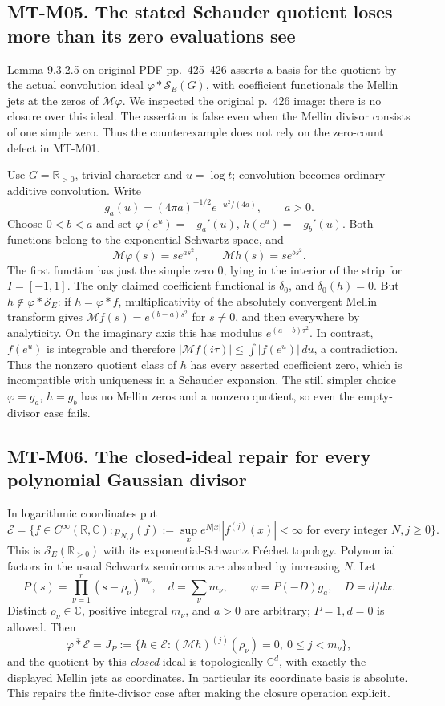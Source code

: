 \subsection*{MT-M05. The stated Schauder quotient loses more than its zero evaluations see}
Lemma 9.3.2.5 on original PDF pp.~425--426 asserts a basis for the
quotient by the actual convolution ideal $\varphi*\mathcal S_E(G)$,
with coefficient functionals the Mellin jets at the zeros of
$\mathcal M\varphi$. We inspected the original p.~426 image: there
is no closure over this ideal. The assertion is false even when the
Mellin divisor consists of one simple zero. Thus the counterexample
does not rely on the zero-count defect in MT-M01.

Use $G=\mathbb R_{>0}$, trivial character and $u=\log t$; convolution
becomes ordinary additive convolution. Write
\[
 g_a(u)=(4\pi a)^{-1/2}e^{-u^2/(4a)},\qquad a>0.
\]
Choose $0<b<a$ and set $\varphi(e^u)=-g_a'(u)$,
$h(e^u)=-g_b'(u)$. Both functions belong to the exponential-Schwartz
space, and
\[
 \mathcal M\varphi(s)=s e^{as^2},\qquad
 \mathcal Mh(s)=s e^{bs^2}.
\]
The first function has just the simple zero $0$, lying in the interior
of the strip for $I=[-1,1]$. The only claimed coefficient functional is
$\delta_0$, and $\delta_0(h)=0$.
But $h\notin\varphi*\mathcal S_E$: if $h=\varphi*f$, multiplicativity
of the absolutely convergent Mellin transform gives
$\mathcal Mf(s)=e^{(b-a)s^2}$ for $s\ne0$, and then everywhere by
analyticity. On the imaginary axis this has modulus
$e^{(a-b)\tau^2}$. In contrast, $f(e^u)$ is integrable and therefore
$|\mathcal Mf(i\tau)|\le\int|f(e^u)|\,du$, a contradiction.
Thus the nonzero quotient class of $h$ has every asserted coefficient
zero, which is incompatible with uniqueness in a Schauder expansion.
The still simpler choice $\varphi=g_a$, $h=g_b$ has no Mellin zeros
and a nonzero quotient, so even the empty-divisor case fails.

\subsection*{MT-M06. The closed-ideal repair for every polynomial Gaussian divisor}
In logarithmic coordinates put
\[
 \mathcal E=\{f\in C^\infty(\mathbb R,\mathbb C):
   p_{N,j}(f):=\sup_x e^{N|x|}|f^{(j)}(x)|<\infty
   \text{ for every integer }N,j\ge0\}.
\]
This is $\mathcal S_E(\mathbb R_{>0})$ with its exponential-Schwartz
Fr\'echet topology. Polynomial factors in the usual Schwartz seminorms
are absorbed by increasing $N$. Let
\[
 P(s)=\prod_{\nu=1}^r(s-\rho_\nu)^{m_\nu},\quad
 d=\sum_\nu m_\nu,\qquad
 \varphi=P(-D)g_a,\quad D=d/dx.
\]
Distinct $\rho_\nu\in\mathbb C$, positive integral $m_\nu$, and
$a>0$ are arbitrary; $P=1,d=0$ is allowed. Then
\[
 \overline{\varphi*\mathcal E}
   =J_P:=\{h\in\mathcal E:
          (\mathcal Mh)^{(j)}(\rho_\nu)=0,
          \ 0\le j<m_\nu\},                         \tag{MT-M6}
\]
and the quotient by this \emph{closed} ideal is topologically
$\mathbb C^d$, with exactly the displayed Mellin jets as coordinates.
In particular its coordinate basis is absolute. This repairs the
finite-divisor case after making the closure operation explicit.

